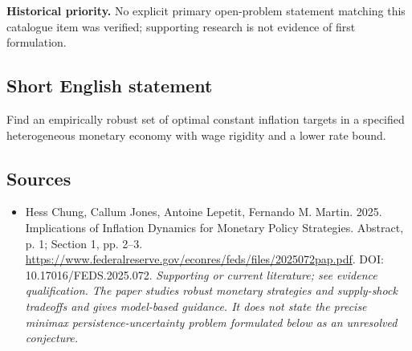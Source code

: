 \documentclass[11pt]{article}
\begin{document}
\par\textbf{Historical priority.} No explicit primary open-problem statement matching this catalogue item was verified; supporting research is not evidence of first formulation.

\subsection{Short English statement}
Find an empirically robust set of optimal constant inflation targets in a specified heterogeneous monetary economy with wage rigidity and a lower rate bound.

\subsection{Sources}
\begin{itemize}\raggedright
\item[\textnormal{[S1]}]\hypertarget{source:30007528:1}{} Hess Chung, Callum Jones, Antoine Lepetit, Fernando M. Martin. 2025. Implications of Inflation Dynamics for Monetary Policy Strategies. Abstract, p. 1; Section 1, pp. 2–3.
\url{https://www.federalreserve.gov/econres/feds/files/2025072pap.pdf}.
DOI: 10.17016/FEDS.2025.072.
{\small\textit{Supporting or current literature; see evidence qualification. The paper studies robust monetary strategies and supply-shock tradeoffs and gives model-based guidance. It does not state the precise minimax persistence-uncertainty problem formulated below as an unresolved conjecture.}}
\end{itemize}
\end{document}
